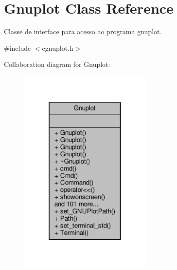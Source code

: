 \hypertarget{classGnuplot}{\section{Gnuplot Class Reference}
\label{classGnuplot}
}


Classe de interface para acesso ao programa gnuplot.  




{\ttfamily \#include $<$cgnuplot.\-h$>$}



Collaboration diagram for Gnuplot\-:
\nopagebreak
\begin{figure}[H]
\begin{center}
\leavevmode
\includegraphics[width=190pt]{classGnuplot__coll__graph}
\end{center}
\end{figure}
